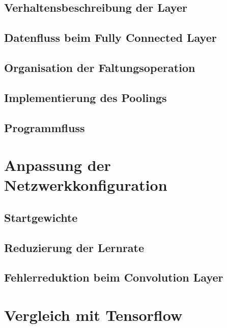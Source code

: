 \documentclass[../main.tex]{subfiles}
\begin{document}
\subsection{Verhaltensbeschreibung der Layer}

\subsection{Datenfluss beim Fully Connected Layer}

\subsection{Organisation der Faltungsoperation}

\subsection{Implementierung des Poolings}

\subsection{Programmfluss}



\section{Anpassung der Netzwerkkonfiguration}

\subsection{Startgewichte}

\subsection{Reduzierung der Lernrate}

\subsection{Fehlerreduktion beim Convolution Layer}


\section{Vergleich mit Tensorflow}
\end{document}
